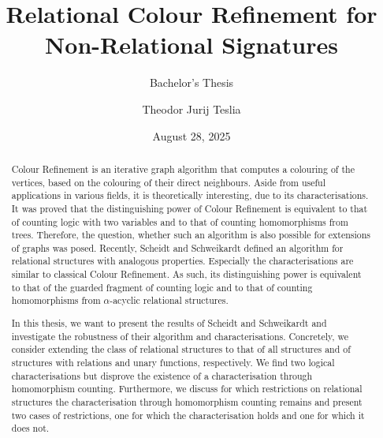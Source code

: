 \documentclass[a4paper,11pt,DIV=14]{scrartcl} %
\theoremstyle{plain}
\theoremstyle{definition}
\begin{document}
\subtitle{Bachelor's Thesis}
\date{August 28, 2025}
\publishers{RWTH Aachen University}	%

\title{Relational Colour Refinement for Non-Relational Signatures}

\author{Theodor Jurij Teslia}

\maketitle

\begin{abstract}
	Colour Refinement is an iterative graph algorithm that computes a colouring of the vertices, based on the colouring of their direct neighbours.
	Aside from useful applications in various fields, it is theoretically interesting, due to its characterisations.
	It was proved that the distinguishing power of Colour Refinement is equivalent to that of counting logic with two variables and to that of counting homomorphisms from trees.
	Therefore, the question, whether such an algorithm is also possible for extensions of graphs was posed.
	Recently, Scheidt and Schweikardt defined an algorithm for relational structures with analogous properties.
	Especially the characterisations are similar to classical Colour Refinement.
	As such, its distinguishing power is equivalent to that of the guarded fragment of counting logic and to that of counting homomorphisms from $\alpha$-acyclic relational structures.
	
	In this thesis, we want to present the results of Scheidt and Schweikardt and investigate the robustness of their algorithm and characterisations.
	Concretely, we consider extending the class of relational structures to that of all structures and of structures with relations and unary functions, respectively.
	We find two logical characterisations but disprove the existence of a characterisation through homomorphism counting.
	Furthermore, we discuss for which restrictions on relational structures the characterisation through homomorphism counting remains and present two cases of restrictions, one for which the characterisation holds and one for which it does not.
\end{abstract}

\thispagestyle{empty}

\clearpage















\clearpage



\end{document}
